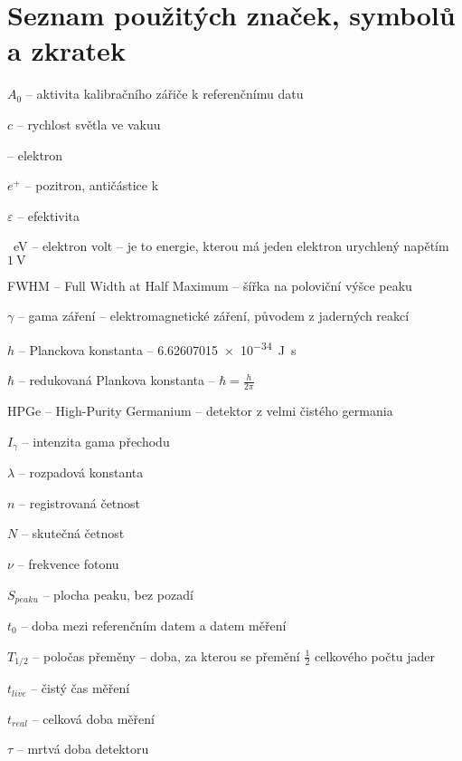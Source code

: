 \section*{Seznam použitých značek, symbolů a zkratek}
\begin{spacing}{1.2}
	\begin{list}{}{}
		\item $A_0$ -- aktivita kalibračního zářiče k referenčnímu datu
		\item $c$ -- rychlost světla ve vakuu %
		\item \e -- elektron%
		\item $e^+$ -- pozitron, antičástice k \e	
		\item $\varepsilon$ -- efektivita
		\item \SI{}{\electronvolt} -- elektron volt -- je to energie, kterou má jeden elektron urychlený napětím $\SI{1}{\volt}$
		\item FWHM -- Full Width at Half Maximum -- šířka na poloviční výšce peaku
		\item $\gamma$ -- gama záření -- elektromagnetické záření, původem z jaderných reakcí
		\item $h$ -- Planckova konstanta -- \SI{6.62607015e-34}{\joule\second} 
		\item $\hbar$ -- redukovaná Plankova konstanta -- $\hbar = \frac{h}{2\pi}$
		\item HPGe -- High-Purity Germanium -- detektor z velmi čistého germania
		\item $I_\gamma$ -- intenzita gama přechodu
		\item $\lambda$ -- rozpadová konstanta %
		\item $n$ -- registrovaná četnost
		\item $N$ -- skutečná četnost
		\item $\nu$ -- frekvence fotonu
		\item $S_{peaku}$ -- plocha peaku, bez pozadí
		\item $t_0$ -- doba mezi referenčním datem a datem měření
		\item $T_{1/2}$ -- poločas přeměny -- doba, za kterou se přemění $\frac{1}{2}$ celkového počtu jader
		\item $t_{live}$ -- čistý čas měření
		\item $t_{real}$ -- celková doba měření
		\item $\tau$ -- mrtvá doba detektoru	
	\end{list}
\end{spacing}
\newpage
{}
